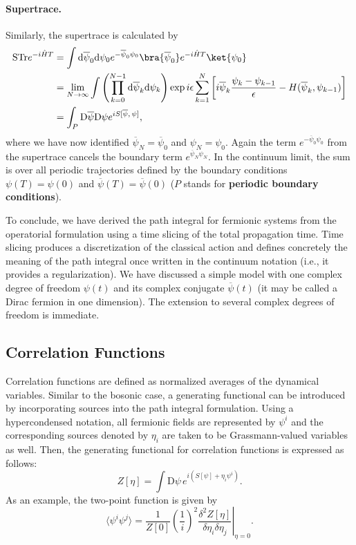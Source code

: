 \paragraph{Supertrace.}
Similarly, the supertrace is calculated by
\[
    \begin{aligned}
        \mathrm{STr} e^{-i \hat{H} T} & = \int \mathrm{d} \overline{\psi}_0 \mathrm{d} \psi_0 e^{-\overline{\psi}_0 \psi_0} \bra{\overline{\psi}_0} e^{-i \hat{H} T} \ket{\psi_0}                                                                                                              \\
                                      & = \lim_{N \to \infty} \int \left( \prod_{k=0}^{N-1} \mathrm{d} \overline{\psi}_k \mathrm{d} \psi_k \right) \exp{ i \epsilon \sum_{k=1}^{N} \left[ i \overline{\psi}_k \frac{\psi_k - \psi_{k-1}}{\epsilon} - H(\overline{\psi}_k, \psi_{k-1}) \right]} \\
                                      & = \int_P \mathrm{D} \overline{\psi} \mathrm{D} \psi e^{i S[\overline{\psi},\,\psi]},
    \end{aligned}
\]
where we have now identified \(\overline{\psi}_N = \overline{\psi}_0\) and \(\psi_N = \psi_0\). Again the term \(e^{-\overline{\psi}_0 \psi_0}\) from the supertrace cancels the boundary term \(e^{\overline{\psi}_N \psi_N}\). In the continuum limit, the sum is over all periodic trajectories defined by the boundary conditions \(\psi(T) = \psi(0)\) and \(\overline{\psi}(T) = \overline{\psi}(0)\)  (\(P\) stands for \textbf{periodic boundary conditions}).

To conclude, we have derived the path integral for fermionic systems from the operatorial formulation using a time slicing of the total propagation time. Time slicing produces a discretization of the classical action and defines concretely the meaning of the path integral once written in the continuum notation (i.e., it provides a regularization). We have discussed a simple model with one complex degree of freedom \(\psi(t)\) and its complex conjugate \(\overline{\psi}(t)\) (it may be called a Dirac fermion in one dimension). The extension to several complex degrees of freedom is immediate.

\subsection{Correlation Functions}

Correlation functions are defined as normalized averages of the dynamical variables. Similar to the bosonic case, a generating functional can be introduced by incorporating sources into the path integral formulation. Using a hypercondensed notation, all fermionic fields are represented by \(\psi^i\) and the corresponding sources denoted by \(\eta_i\) are taken to be Grassmann-valued variables as well. Then, the generating functional for correlation functions is expressed as follows:
\[
    Z[\eta] = \int \mathrm{D} \psi \, e^{i \left( S[\psi] + \eta_i \psi^i \right)}.
\]
As an example, the two-point function is given by
\[
    \langle \psi^{i} \psi^{j} \rangle = \frac{1}{Z[0]} \left. \left(\frac{1}{i}\right)^2\frac{\delta^2 Z[\eta]}{\delta \eta_i \delta \eta_j} \right|_{\eta=0}.
\]

